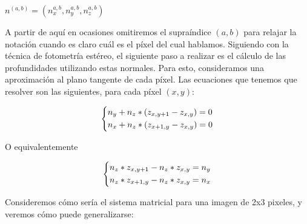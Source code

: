 \begin{center}
$n^{(a,b)} = (n_{x}^{a,b}, n_{y}^{a,b}, n_{z}^{a,b})$
\end{center}

A partir de aquí en ocasiones omitiremos el supraíndice $(a,b)$ para relajar la notación cuando es claro cuál es el píxel del cual hablamos. Siguiendo con la técnica de fotometría estéreo, el siguiente paso a realizar es el cálculo de las profundidades utilizando estas normales. Para esto, consideramos una aproximación al plano tangente de cada píxel. Las ecuaciones que tenemos que resolver son las siguientes, para cada píxel $(x ,y)$:

\begin{center}
\[
    \begin{dcases}
        n_{y} +  n_{z} * (z_{x, y+1} - z_{x, y}) = 0 \\
        n_{x} +  n_{z} * (z_{x+1, y} - z_{x, y}) = 0
    \end{dcases}
\]
\end{center}
O equivalentemente
\begin{center}
\[\begin{dcases}
        n_{z} * z_{x, y+1} - n_{z} *  z_{x, y} = n_{y}  \\
        n_{z} * z_{x+1, y} - n_{z} *  z_{x, y} = n_{x}
    \end{dcases}
\]
\end{center}

Consideremos cómo sería el sistema matricial para una imagen de 2x3 pixeles, y veremos cómo puede generalizarse: \\


